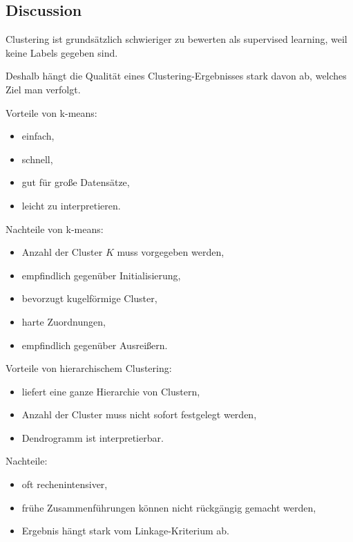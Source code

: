 \documentclass[11pt,a4paper]{scrartcl}
\begin{document}
\subsection{Discussion}

\begin{notebox}
    Clustering ist grundsätzlich schwieriger zu bewerten als supervised learning,
    weil keine Labels gegeben sind.

    Deshalb hängt die Qualität eines Clustering-Ergebnisses stark davon ab,
    welches Ziel man verfolgt.
\end{notebox}

\begin{solutionbox}
    Vorteile von k-means:

    \begin{itemize}
        \item einfach,
        \item schnell,
        \item gut für große Datensätze,
        \item leicht zu interpretieren.
    \end{itemize}

    Nachteile von k-means:

    \begin{itemize}
        \item Anzahl der Cluster \(K\) muss vorgegeben werden,
        \item empfindlich gegenüber Initialisierung,
        \item bevorzugt kugelförmige Cluster,
        \item harte Zuordnungen,
        \item empfindlich gegenüber Ausreißern.
    \end{itemize}
\end{solutionbox}

\begin{solutionbox}
    Vorteile von hierarchischem Clustering:

    \begin{itemize}
        \item liefert eine ganze Hierarchie von Clustern,
        \item Anzahl der Cluster muss nicht sofort festgelegt werden,
        \item Dendrogramm ist interpretierbar.
    \end{itemize}

    Nachteile:

    \begin{itemize}
        \item oft rechenintensiver,
        \item frühe Zusammenführungen können nicht rückgängig gemacht werden,
        \item Ergebnis hängt stark vom Linkage-Kriterium ab.
    \end{itemize}
\end{solutionbox}
\end{document}
